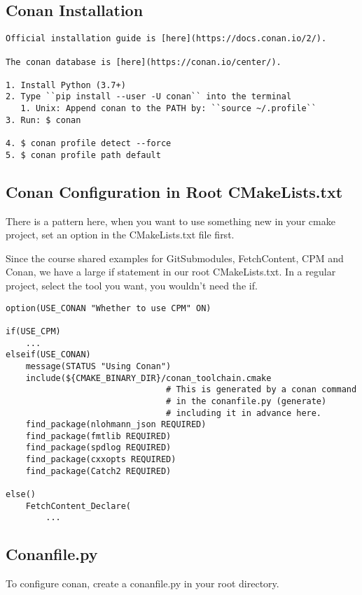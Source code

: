 \subsection{Conan Installation}

\begin{verbatim}
Official installation guide is [here](https://docs.conan.io/2/).

The conan database is [here](https://conan.io/center/).

1. Install Python (3.7+)
2. Type ``pip install --user -U conan`` into the terminal
   1. Unix: Append conan to the PATH by: ``source ~/.profile``
3. Run: $ conan

4. $ conan profile detect --force
5. $ conan profile path default
\end{verbatim}


\subsection{Conan Configuration in Root CMakeLists.txt}

There is a pattern here, when you want to use something new in your cmake project,
set an option in the CMakeLists.txt file first.

Since the course shared examples for GitSubmodules, FetchContent, CPM and Conan,
we have a large if statement in our root CMakeLists.txt. In a regular project, 
select the tool you want, you wouldn't need the if.

\begin{verbatim}
option(USE_CONAN "Whether to use CPM" ON)

if(USE_CPM)
    ...
elseif(USE_CONAN)
    message(STATUS "Using Conan")
    include(${CMAKE_BINARY_DIR}/conan_toolchain.cmake  
                                # This is generated by a conan command
                                # in the conanfile.py (generate)
                                # including it in advance here.
    find_package(nlohmann_json REQUIRED)
    find_package(fmtlib REQUIRED)
    find_package(spdlog REQUIRED)
    find_package(cxxopts REQUIRED)
    find_package(Catch2 REQUIRED)

else()
    FetchContent_Declare(
        ...
\end{verbatim}

\subsection{Conanfile.py}

To configure conan, create a conanfile.py in your root directory.

